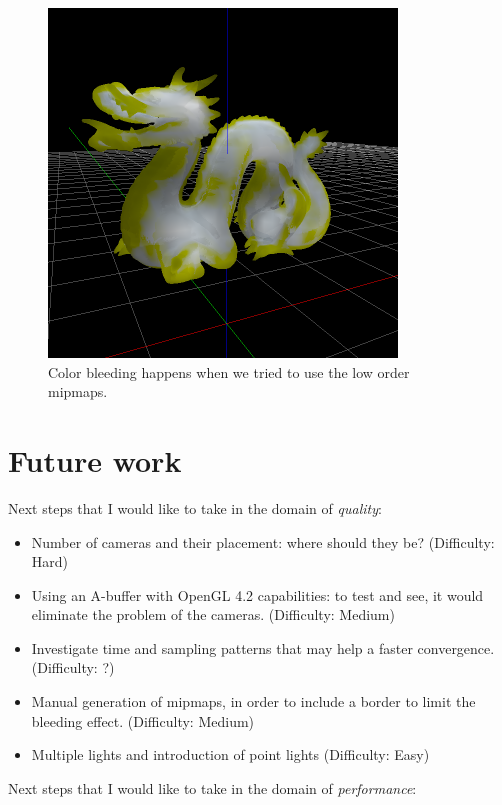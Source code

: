 \documentclass[12pt, twoside,a4paper]{article}
\begin{document}
\vspace{0.5cm}
\begin{figure}[!h]
\centering
\includegraphics[width=350px]{lod.png}
\caption{Color bleeding happens when we tried to use the low order mipmaps.}

\end{figure}


\clearpage
\section{Future work}
Next steps that I would like to take in the domain of \textit{quality}:

\begin{itemize}
	\item Number of cameras and their placement: where should they be? (Difficulty: Hard)
	\item Using an A-buffer with OpenGL 4.2 capabilities: to test and see, it would eliminate the problem of the cameras. (Difficulty: Medium)
	\item Investigate time and sampling patterns that may help a faster convergence. (Difficulty: ?)
	\item Manual generation of mipmaps, in order to include a border to limit the bleeding effect. (Difficulty: Medium)
	\item Multiple lights and introduction of point lights (Difficulty: Easy)
\end{itemize}

Next steps that I would like to take in the domain of \textit{performance}:
\end{document}
